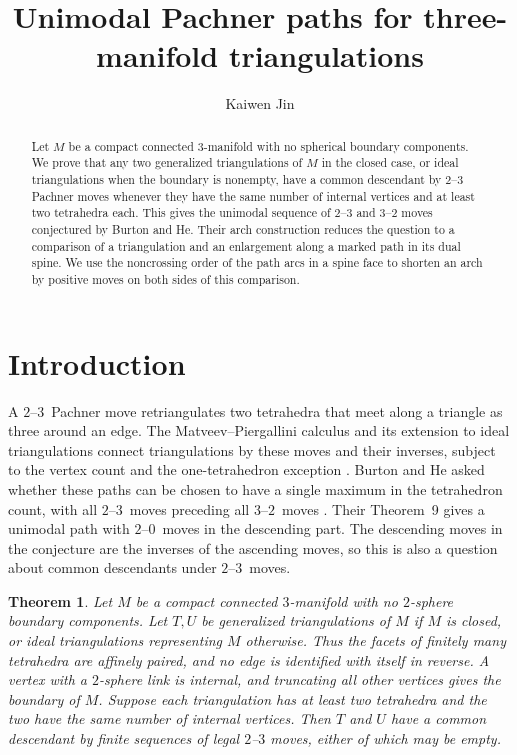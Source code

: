 \documentclass[11pt]{amsart}
\title{Unimodal Pachner paths for three-manifold triangulations}
\author{Kaiwen Jin}
\newtheorem{theorem}{Theorem}
\newcommand{\moveup}{\(2\)--\(3\)}
\newcommand{\movedown}{\(3\)--\(2\)}
\newcommand{\twotozero}{\(2\)--\(0\)}
\begin{document}
\begin{abstract}
Let \(M\) be a compact connected \(3\)-manifold with no spherical
boundary components. We prove that any two generalized triangulations of
\(M\) in the closed case, or ideal triangulations when the boundary is nonempty, have
a common descendant by \(2\)--\(3\) Pachner moves whenever they have the same
number of internal vertices and at least two tetrahedra each. This gives the
unimodal sequence of \(2\)--\(3\) and \(3\)--\(2\) moves conjectured by Burton
and He. Their arch construction reduces the question to a comparison of a
triangulation and an enlargement along a marked path in its dual spine. We use
the noncrossing order of the path arcs in a spine face to shorten an arch by
positive moves on both sides of this comparison.
\end{abstract}
\maketitle

\section{Introduction}

A \moveup\ Pachner move retriangulates two tetrahedra that meet along a
triangle as three around an edge. The Matveev--Piergallini calculus and its
extension to ideal triangulations connect triangulations by these moves and
their inverses, subject to the vertex count and the one-tetrahedron
exception \cite{amendola,rst}. Burton and He asked whether these paths can be
chosen to have a single maximum in the tetrahedron count, with all
\moveup\ moves preceding all \movedown\ moves \cite[Conjecture~8]{bh}. Their
Theorem~9 gives a unimodal path with \twotozero\ moves in the descending
part. The descending moves in the conjecture are the inverses of the
ascending moves, so this is also a question about common descendants under
\moveup\ moves.

\begin{theorem}\label{thm:main}
Let \(M\) be a compact connected \(3\)-manifold with no \(2\)-sphere boundary
components. Let \(T,U\) be generalized triangulations of \(M\) if \(M\) is
closed, or ideal triangulations representing \(M\) otherwise. Thus the facets
of finitely many tetrahedra are affinely paired, and no edge is identified
with itself in reverse. A vertex with a \(2\)-sphere link is internal, and
truncating all other vertices gives the boundary of \(M\). Suppose each
triangulation has at least two tetrahedra and the two have the same number
of internal vertices. Then \(T\) and \(U\) have a common descendant by finite
sequences of legal \(2\)--\(3\) moves, either of which may be empty.
\end{theorem}
\end{document}
